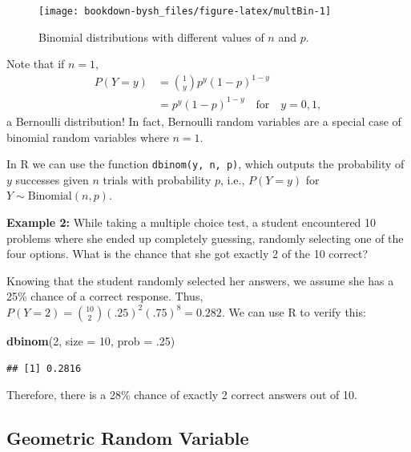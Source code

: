 \documentclass[
]{krantz}
\newenvironment{Shaded}{\begin{snugshade}}{\end{snugshade}}
\newcommand{\DataTypeTok}[1]{\textcolor[rgb]{0.27,0.27,0.27}{#1}}
\newcommand{\DecValTok}[1]{\textcolor[rgb]{0.06,0.06,0.06}{#1}}
\newcommand{\FloatTok}[1]{\textcolor[rgb]{0.06,0.06,0.06}{#1}}
\newcommand{\KeywordTok}[1]{\textcolor[rgb]{0.27,0.27,0.27}{\textbf{#1}}}
\newcommand{\NormalTok}[1]{#1}
\begin{document}
\begin{figure}

{\centering \texttt{[image: bookdown-bysh\_files/figure-latex/multBin-1]} 

}

\caption{Binomial distributions with different values of \(n\) and \(p\).}\label{fig:multBin}
\end{figure}

Note that if \(n=1\),
\begin{align*}
 P(Y=y) &= \binom{1}{y} p^y(1-p)^{1-y} \\
        &= p^y(1-p)^{1-y}\quad \textrm{for}\quad y = 0, 1,
\end{align*}
a Bernoulli distribution! In fact, Bernoulli random variables are a special case of binomial random variables where \(n=1\).

In R we can use the function \texttt{dbinom(y,\ n,\ p)}, which outputs the probability of \(y\) successes given \(n\) trials with probability \(p\), i.e., \(P(Y=y)\) for \(Y \sim \textrm{Binomial}(n,p)\).

\textbf{Example 2:} While taking a multiple choice test, a student encountered 10 problems where she ended up completely guessing, randomly selecting one of the four options. What is the chance that she got exactly 2 of the 10 correct?

Knowing that the student randomly selected her answers, we assume she has a 25\% chance of a correct response. Thus, \(P(Y=2) = {10 \choose 2}(.25)^2(.75)^8 = 0.282\). We can use R to verify this:

\begin{Shaded}
\begin{Highlighting}[]
\KeywordTok{dbinom}\NormalTok{(}\DecValTok{2}\NormalTok{, }\DataTypeTok{size =} \DecValTok{10}\NormalTok{, }\DataTypeTok{prob =} \FloatTok{.25}\NormalTok{)}
\end{Highlighting}
\end{Shaded}

\begin{verbatim}
## [1] 0.2816
\end{verbatim}

Therefore, there is a 28\% chance of exactly 2 correct answers out of 10.

\hypertarget{geometric-random-variable}{%
\subsection{Geometric Random Variable}\label{geometric-random-variable}}
\end{document}
